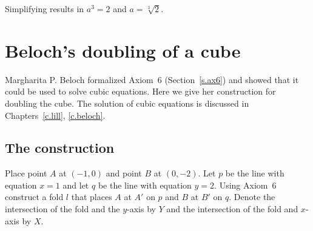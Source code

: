 Simplifying results in $a^3=2$ and $a=\sqrt[3]{2}$.



\newpage

\section{Beloch's doubling of a cube}\label{s.cube2}

Margharita P. Beloch formalized Axiom~6 (Section~\ref{s.ax6}) and showed that it could be used to solve cubic equations. Here we give her construction for doubling the cube. The solution of cubic equations is discussed in Chapters~\ref{c.lill}, \ref{c.beloch}.

\subsection{The construction}

Place point $A$ at $(-1,0)$ and point $B$ at $(0,-2)$. Let $p$ be the line with equation $x=1$ and let $q$ be the line with equation $y=2$. Using Axiom~6 construct a fold $l$ that places $A$ at $A'$ on $p$ and $B$ at $B'$ on $q$. Denote the intersection of the fold and the $y$-axis by $Y$ and the intersection of the fold and $x$-axis by $X$.

